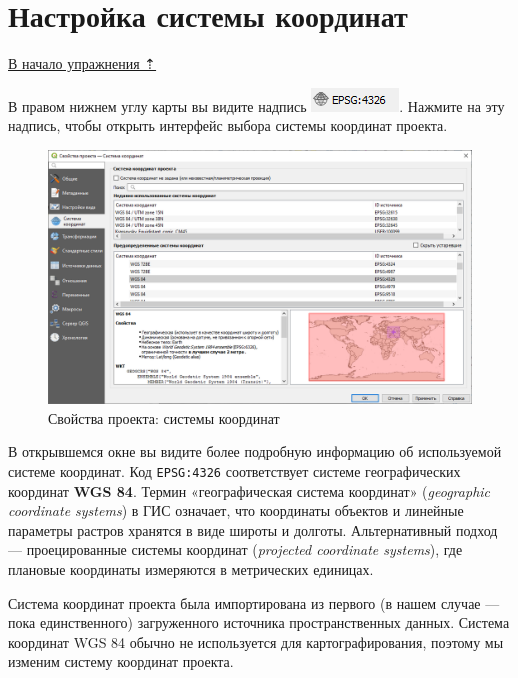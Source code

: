 \documentclass[
  12pt,
]{book}
\begin{document}
\hypertarget{map-design-general-projection}{%
\section{Настройка системы координат}\label{map-design-general-projection}}

\protect\hyperlink{map-design-general}{В начало упражнения ⇡}

В правом нижнем углу карты вы видите надпись \includegraphics{images/Ex01_MapGeneral/pic02.png}. Нажмите на эту надпись, чтобы открыть интерфейс выбора системы координат проекта.

\begin{figure}
\centering
\includegraphics{images/Ex01_MapGeneral/Properties_CoordinateSystem.png}
\caption{Свойства проекта: системы координат}
\end{figure}

В открывшемся окне вы видите более подробную информацию об используемой системе координат. Код \texttt{EPSG:4326} соответствует системе географических координат \textbf{WGS 84}. Термин «географическая система координат» (\emph{geographic coordinate systems}) в ГИС означает, что координаты объектов и линейные параметры растров хранятся в виде широты и долготы. Альтернативный подход --- проецированные системы координат (\emph{projected coordinate systems}), где плановые координаты измеряются в метрических единицах.

Система координат проекта была импортирована из первого (в нашем случае --- пока единственного) загруженного источника пространственных данных. Система координат WGS 84 обычно не используется для картографирования, поэтому мы изменим систему координат проекта.
\end{document}

